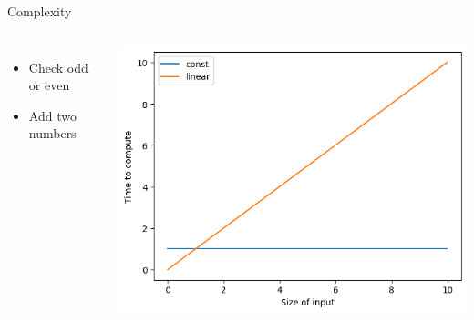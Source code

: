\documentclass{beamer}
\begin{document}
\begin{frame}{Complexity}
    \begin{columns}
    \begin{itemize}
        \item Check odd or even\\
        \item Add two numbers \\
    \end{itemize}
    \includegraphics[width=\columnwidth]{images/complex1.png}
    \end{columns}
\end{frame}
\end{document}
